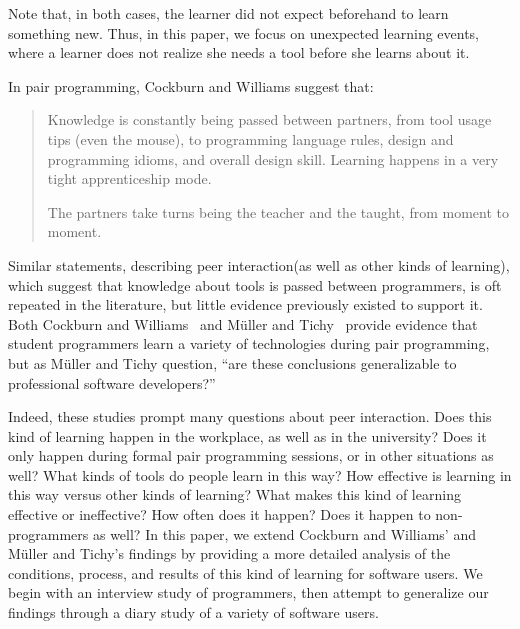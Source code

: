 \documentclass[smallextended]{svjour3}
\newcommand\discovery{peer interaction\xspace}
\begin{document}
\noindent
Note that, in both cases, the learner did not expect beforehand to 
learn something new.
Thus, in this paper, we focus on unexpected learning events, 
where a learner does not realize she needs a tool before she 
learns about it.

In pair programming, Cockburn and Williams suggest that:


\begin{quote} 
Knowledge is constantly being passed between
partners, from tool usage tips (even the mouse),
to programming language rules, design and
programming idioms, and overall design skill.
Learning happens in a very tight apprenticeship
mode. 

The partners take turns being the teacher
and the taught, from moment to moment.
\end{quote}

\noindent
Similar statements, describing \discovery (as well as other kinds of learning),
which suggest that knowledge about tools is passed between programmers, is oft
repeated in the literature, but little evidence previously existed to support
it. Both Cockburn and Williams~\citeyearpar{cockburn00} and M\"{u}ller and
Tichy~\citeyearpar{muller} provide evidence that student programmers learn a variety
of technologies during pair programming, but as M\"{u}ller and
Tichy question, ``are these conclusions generalizable to professional software
developers?''

Indeed, these studies prompt many questions about \discovery. 
Does this kind of learning happen in the workplace, as well as in
the university?
Does it only happen during formal pair programming sessions, or in other situations as well?
What kinds of tools do people learn in this way?
How effective is learning in this way versus other kinds of learning?
What makes this kind of learning effective or ineffective?
How often does it happen?
Does it happen to non-programmers as well?
In this paper, we extend Cockburn and Williams' and M\"{u}ller and
Tichy's findings by providing a more detailed analysis of
the conditions, process, and results of this kind of learning for
software users.
We begin with an interview study of programmers, then attempt to generalize
our findings through a diary study of a variety of software users.
\end{document}
